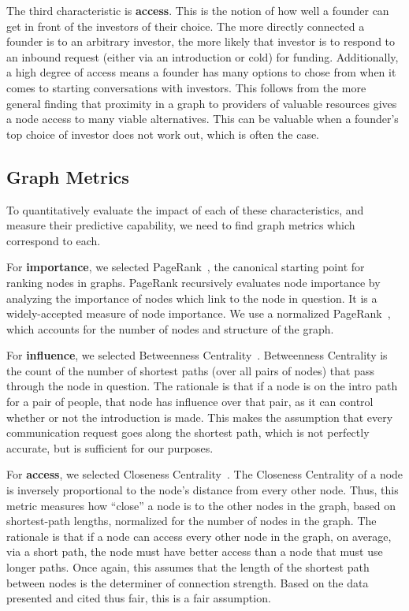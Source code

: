 The third characteristic is \textbf{access}. This is the notion of how well a founder can get in front of the investors of their choice. The more directly connected a founder is to an arbitrary investor, the more likely that investor is to respond to an inbound request (either via an introduction or cold) for funding. Additionally, a high degree of access means a founder has many options to chose from when it comes to starting conversations with investors. This follows from the more general finding that proximity in a graph to providers of valuable resources gives a node access to many viable alternatives\cite{10.2307/3069443}. This can be valuable when a founder's top choice of investor does not work out, which is often the case.

\subsection{Graph Metrics}

To quantitatively evaluate the impact of each of these characteristics, and measure their predictive capability, we need to find graph metrics which correspond to each.

For \textbf{importance}, we selected PageRank~\cite{page1999pagerank}, the canonical starting point for ranking nodes in graphs. PageRank recursively evaluates node importance by analyzing the importance of nodes which link to the node in question. It is a widely-accepted measure of node importance. We use a normalized PageRank~\cite{berberich2007comparing}, which accounts for the number of nodes and structure of the graph.

For \textbf{influence}, we selected Betweenness Centrality~\cite{10.2307/3033543}. Betweenness Centrality is the count of the number of shortest paths (over all pairs of nodes) that pass through the node in question. The rationale is that if a node is on the intro path for a pair of people, that node has influence over that pair, as it can control whether or not the introduction is made. This makes the assumption that every communication request goes along the shortest path, which is not perfectly accurate, but is sufficient for our purposes.

For \textbf{access}, we selected Closeness Centrality~\cite{FREEMAN1978215}. The Closeness Centrality of a node is inversely proportional to the node's distance from every other node. Thus, this metric measures how ``close'' a node is to the other nodes in the graph, based on shortest-path lengths, normalized for the number of nodes in the graph. The rationale is that if a node can access every other node in the graph, on average, via a short path, the node must have better access than a node that must use longer paths. Once again, this assumes that the length of the shortest path between nodes is the determiner of connection strength. Based on the data presented and cited thus fair, this is a fair assumption.

